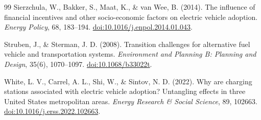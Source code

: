 \documentclass[11pt]{article}
\begin{document}
\begin{thebibliography}{99}
Sierzchula, W., Bakker, S., Maat, K., \& van Wee, B. (2014).
The influence of financial incentives and other socio-economic factors on
electric vehicle adoption.
\emph{Energy Policy}, 68, 183--194.
\href{https://doi.org/10.1016/j.enpol.2014.01.043}{doi:10.1016/j.enpol.2014.01.043}.

Struben, J., \& Sterman, J. D. (2008).
Transition challenges for alternative fuel vehicle and transportation systems.
\emph{Environment and Planning B: Planning and Design}, 35(6), 1070--1097.
\href{https://doi.org/10.1068/b33022t}{doi:10.1068/b33022t}.

White, L. V., Carrel, A. L., Shi, W., \& Sintov, N. D. (2022).
Why are charging stations associated with electric vehicle adoption? Untangling
effects in three United States metropolitan areas.
\emph{Energy Research \& Social Science}, 89, 102663.
\href{https://doi.org/10.1016/j.erss.2022.102663}{doi:10.1016/j.erss.2022.102663}.

\end{thebibliography}
\end{document}
